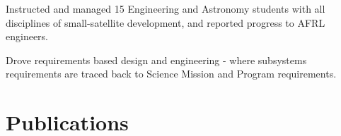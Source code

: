\documentclass[]{deedy-resume-openfont}
\begin{document}
\begin{tightemize2}
\item Instructed and managed 15 Engineering and Astronomy students with all disciplines of small-satellite development, and reported progress to AFRL engineers.
\item Drove requirements based design and engineering - where subsystems requirements are traced back to Science Mission and Program requirements.
\end{tightemize2}
\sectionsep




\section{Publications}
\sectionsep
\end{document}
